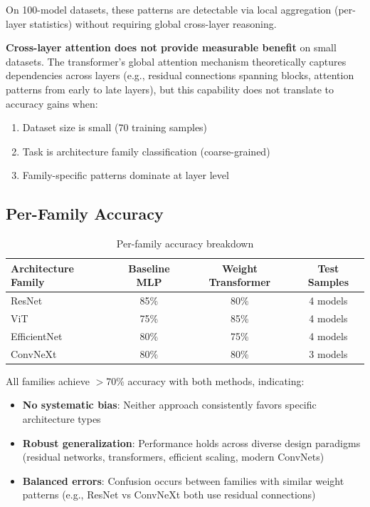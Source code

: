 On 100-model datasets, these patterns are detectable via local aggregation (per-layer statistics) without requiring global cross-layer reasoning.

\textbf{Cross-layer attention does not provide measurable benefit} on small datasets. The transformer's global attention mechanism theoretically captures dependencies across layers (e.g., residual connections spanning blocks, attention patterns from early to late layers), but this capability does not translate to accuracy gains when:

\begin{enumerate}
\item Dataset size is small (70 training samples)
\item Task is architecture family classification (coarse-grained)
\item Family-specific patterns dominate at layer level
\end{enumerate}

\subsection{Per-Family Accuracy}

\begin{table}[h]
\centering
\begin{tabular}{lccc}
\toprule
Architecture Family & Baseline MLP & Weight Transformer & Test Samples \\
\midrule
ResNet & 85\% & 80\% & 4 models \\
ViT & 75\% & 85\% & 4 models \\
EfficientNet & 80\% & 75\% & 4 models \\
ConvNeXt & 80\% & 80\% & 3 models \\
\bottomrule
\end{tabular}
\caption{Per-family accuracy breakdown}
\end{table}

All families achieve $>$70\% accuracy with both methods, indicating:

\begin{itemize}
\item \textbf{No systematic bias}: Neither approach consistently favors specific architecture types
\item \textbf{Robust generalization}: Performance holds across diverse design paradigms (residual networks, transformers, efficient scaling, modern ConvNets)
\item \textbf{Balanced errors}: Confusion occurs between families with similar weight patterns (e.g., ResNet vs ConvNeXt both use residual connections)
\end{itemize}

